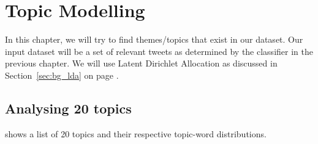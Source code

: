 \chapter{Topic Modelling}
\label{cha:topic_modelling}
In this chapter, we will try to find themes/topics that exist in our dataset. Our input dataset will
be a set of relevant tweets as determined by the classifier in the previous chapter. We will use
Latent Dirichlet Allocation as discussed in Section~\ref{sec:bg_lda} on page \pageref{sec:bg_lda}.

\section{Analysing 20 topics}
\label{sec:analysing_20_topics}
 shows a list of 20 topics and their respective topic-word distributions.

